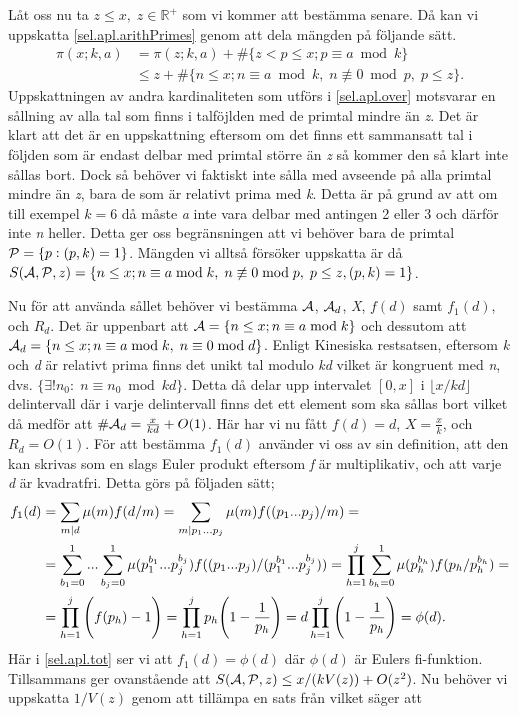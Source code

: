 Låt oss nu ta \(z\leq x,\; z \in \mathbb{R}^+\) som vi kommer att bestämma senare. Då kan vi uppskatta \eqref{sel.apl.arithPrimes} genom att dela mängden på följande sätt.
\begin{align}
    \pi(x;k,a) &= \pi(z;k,a) + \#\{z<p\leq x; p \equiv a \bmod{k}\} \nonumber\\
    &\leq z + \#\{n\leq x; n \equiv a \bmod k,\; n \not\equiv 0 \bmod p,\; p\leq z\}.\label{sel.apl.over}
\end{align}
Uppskattningen av andra kardinaliteten som utförs i \eqref{sel.apl.over} motsvarar en sållning av alla tal som finns i talföjlden med de primtal mindre än \textit{z}. 
Det är klart att det är en uppskattning eftersom om det finns ett sammansatt tal i följden som är endast delbar med primtal större än \textit{z} så kommer den så klart inte sållas bort. 
Dock så behöver vi faktiskt inte sålla med avseende på alla primtal mindre än \textit{z}, bara de som är relativt prima med \textit{k}. Detta är på grund av att om till exempel \(k = 6\) då måste \textit{a} inte vara delbar med antingen 2 eller 3 och därför inte \textit{n} heller. 
Detta ger oss begränsningen att vi behöver bara de primtal \(\P = \{p: (p, k) = 1\}\). 
Mängden vi alltså försöker uppskatta är då \(\S{A}{P}{z} = \{n\leq x; n \equiv a \bmod k,\; n \not\equiv 0 \bmod p,\; p\leq z, (p,k) = 1\}\).

Nu för att använda sållet behöver vi bestämma \(\A\), \(\A_d\), \textit{X}, \(f(d)\) samt \(f_1(d)\), och \(R_d\). Det är uppenbart att \(\A = \{n\leq x; n \equiv a \bmod k\}\) och dessutom att \(\A_d = \{n \leq x; n \equiv a \bmod k,\; n \equiv 0 \bmod d\}\). Enligt Kinesiska restsatsen, eftersom \textit{k} och \textit{d} är relativt prima finns det unikt tal modulo \textit{kd} vilket är kongruent med \textit{n}, dvs. \(\{\exists! n_0:\; n \equiv n_0 \bmod kd\}\). Detta då delar upp intervalet \([0, x]\) i \(\lfloor x/{kd}\rfloor\) delintervall där i varje delintervall finns det ett element som ska sållas bort vilket då medför att \(\#\A_d = \frac{x}{kd} + O(1)\). Här har vi nu fått \(f(d) = d\), \(X = \frac{x}{k}\), och \(R_d = O(1)\). För att bestämma \(f_1(d)\) använder vi oss av sin definition, att den kan skrivas som en slags Euler produkt eftersom \textit{f} är multiplikativ, och att varje \textit{d} är kvadratfri. Detta görs på följaden sätt;
\begin{align}
    f_1(d) &= \sum_{m\divides d}\mu(m)f(d/m) = \sum_{m\divides p_1...p_j}\mu(m)f((p_1...p_j)/m) = \nonumber\\
    &=\sum_{b_1 = 0}^1...\sum_{b_j = 0}^1\mu(p_1^{b_1}...p_j^{b_j})f((p_1...p_j)/(p_1^{b_1}...p_j^{b_j})) = \prod_{h = 1}^j\sum_{b_h = 0}^1\mu(p_h^{b_h})f(p_h/p_h^{b_h}) = \nonumber\\
    &= \prod_{h = 1}^j\Bigg(f(p_h) - 1\Bigg) = \prod_{h = 1}^j p_h\Bigg(1 - \frac{1}{p_h}\Bigg) = d\prod_{h = 1}^j \Bigg(1 - \frac{1}{p_h}\Bigg) = \phi(d).\label{sel.apl.tot}
\end{align}
Här i \eqref{sel.apl.tot} ser vi att \(f_1(d) = \phi(d)\) där \(\phi(d)\) är Eulers fi-funktion. Tillsammans ger ovanstående att \(\S{A}{P}{z} \leq x/(kV(z)) + O(z^2)\). Nu behöver vi uppskatta \(1/V(z)\) genom att tillämpa en sats från \cite[Kap. 7]{cojocarumurty} vilket säger att

